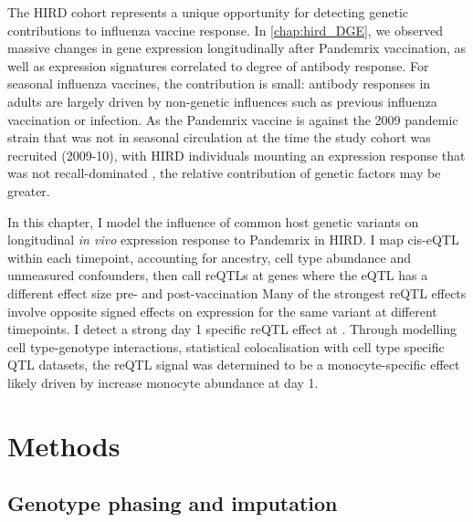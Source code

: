 The HIRD cohort represents a unique opportunity for detecting genetic contributions to influenza vaccine response.
In \autoref{chap:hird_DGE}, we observed massive changes in gene expression longitudinally after Pandemrix vaccination, as well as expression signatures correlated to degree of antibody response.
For seasonal influenza vaccines, the contribution is small: antibody responses in adults are largely driven by non-genetic influences such as previous influenza vaccination or infection\autocite{brodin2015VariationHumanImmune}.
As the Pandemrix vaccine is against the 2009 pandemic strain that was not in seasonal circulation at the time the study cohort was recruited (2009-10), 
with \gls{HIRD} individuals mounting an expression response that was not recall-dominated \autocite{sobolev2016AdjuvantedInfluenzaH1N1Vaccination},
the relative contribution of genetic factors may be greater.

In this chapter, I model the influence of common host genetic variants on longitudinal \textit{in vivo} expression response to Pandemrix in \gls{HIRD}.
I map cis-eQTL within each timepoint, accounting for ancestry, cell type abundance and unmeasured confounders, then call reQTLs at genes where the eQTL has a different effect size pre- and post-vaccination
Many of the strongest reQTL effects involve opposite signed effects on expression for the same variant at different timepoints.
I detect a strong day 1 specific reQTL effect at .
Through modelling cell type-genotype interactions, statistical colocalisation with cell type specific QTL datasets, 
the reQTL signal was determined to be a monocyte-specific effect likely driven by increase monocyte abundance at day 1.

\section{Methods}

\subsection{Genotype phasing and imputation}
\label{subsec:hird_reQTL_methods_genotypePhasingAndImputation}

